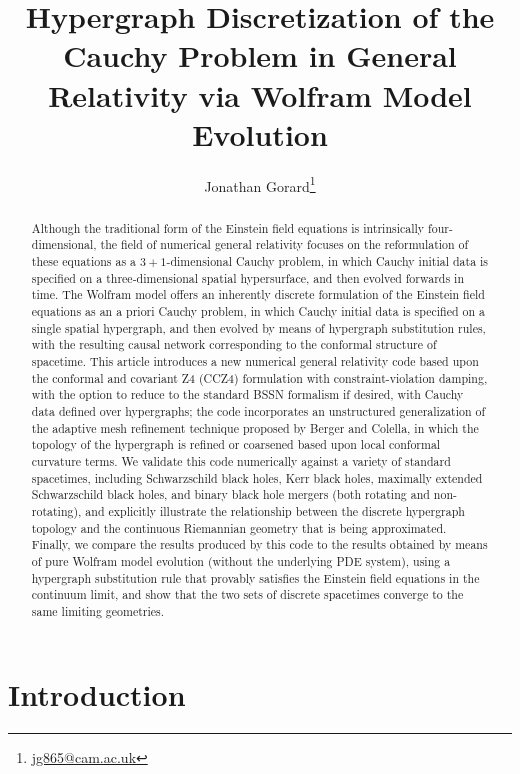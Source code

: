 \documentclass{article}
\title{Hypergraph Discretization of the Cauchy Problem in General Relativity via Wolfram Model Evolution}
\author{Jonathan Gorard\footnote{\url{jg865@cam.ac.uk}}}
\begin{document}
\maketitle

\begin{abstract}
Although the traditional form of the Einstein field equations is intrinsically four-dimensional, the field of numerical general relativity focuses on the reformulation of these equations as a ${3 + 1}$-dimensional Cauchy problem, in which Cauchy initial data is specified on a three-dimensional spatial hypersurface, and then evolved forwards in time. The Wolfram model offers an inherently discrete formulation of the Einstein field equations as an a priori Cauchy problem, in which Cauchy initial data is specified on a single spatial hypergraph, and then evolved by means of hypergraph substitution rules, with the resulting causal network corresponding to the conformal structure of spacetime. This article introduces a new numerical general relativity code based upon the conformal and covariant Z4 (CCZ4) formulation with constraint-violation damping, with the option to reduce to the standard BSSN formalism if desired, with Cauchy data defined over hypergraphs; the code incorporates an unstructured generalization of the adaptive mesh refinement technique proposed by Berger and Colella, in which the topology of the hypergraph is refined or coarsened based upon local conformal curvature terms. We validate this code numerically against a variety of standard spacetimes, including Schwarzschild black holes, Kerr black holes, maximally extended Schwarzschild black holes, and binary black hole mergers (both rotating and non-rotating), and explicitly illustrate the relationship between the discrete hypergraph topology and the continuous Riemannian geometry that is being approximated. Finally, we compare the results produced by this code to the results obtained by means of pure Wolfram model evolution (without the underlying PDE system), using a hypergraph substitution rule that provably satisfies the Einstein field equations in the continuum limit, and show that the two sets of discrete spacetimes converge to the same limiting geometries.
\end{abstract}

\tableofcontents

\newpage

\section{Introduction}
\end{document}
